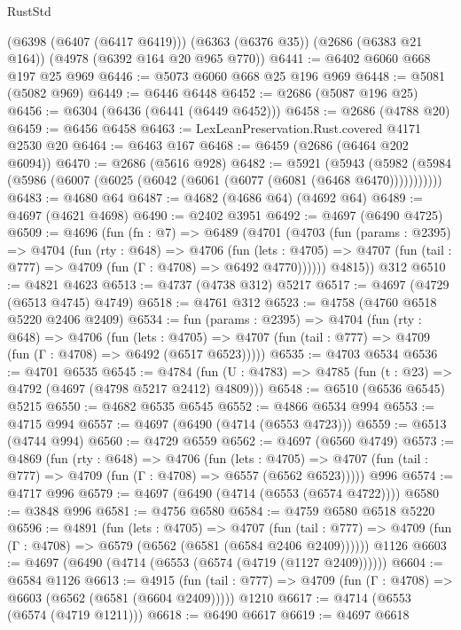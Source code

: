 \begin{lexlean}{RustStd}
\begin{coremodule}
    (@6398 (@6407 (@6417 @6419)))
    (@6363 (@6376 @35))
    (@2686 (@6383 @21 @164))
    (@4978 (@6392 @164 @20 @965 @770))
@6441 := @6402 @6060 @668 @197 @25 @969
@6446 := @5073 @6060 @668 @25 @196 @969
@6448 := @5081 (@5082 @969)
@6449 := @6446 @6448
@6452 := @2686 (@5087 @196 @25)
@6456 := @6304 (@6436 (@6441 (@6449 @6452)))
@6458 := @2686 (@4788 @20)
@6459 := @6456 @6458
@6463 := LexLeanPreservation.Rust.covered @4171 @2530 @20
@6464 := @6463 @167
@6468 := @6459 (@2686 (@6464 @202 @6094))
@6470 := @2686 (@5616 @928)
@6482 := @5921
    (@5943 (@5982 (@5984 (@5986 (@6007 (@6025 (@6042 (@6061 (@6077 (@6081 (@6468 @6470)))))))))))
@6483 := @4680 @64
@6487 := @4682 (@4686 @64) (@4692 @64)
@6489 := @4697 (@4621 @4698)
@6490 := @2402 @3951
@6492 := @4697 (@6490 @4725)
@6509 := @4696
    (fun (fn : @7) =>
    @6489
      (@4701
        (@4703
          (fun (params : @2395) =>
          @4704
            (fun (rty : @648) =>
            @4706
              (fun (lets : @4705) =>
              @4707 (fun (tail : @777) => @4709 (fun (Γ : @4708) => @6492 @4770))))))
        @4815))
    @312
@6510 := @4821 @4623
@6513 := @4737 (@4738 @312) @5217
@6517 := @4697 (@4729 (@6513 @4745) @4749)
@6518 := @4761 @312
@6523 := @4758 (@4760 @6518 @5220 @2406 @2409)
@6534 := fun (params : @2395) =>
  @4704
    (fun (rty : @648) =>
    @4706
      (fun (lets : @4705) =>
      @4707 (fun (tail : @777) => @4709 (fun (Γ : @4708) => @6492 (@6517 @6523)))))
@6535 := @4703 @6534
@6536 := @4701 @6535
@6545 := @4784 (fun (U : @4783) => @4785 (fun (t : @23) => @4792 (@4697 (@4798 @5217 @2412) @4809)))
@6548 := @6510 (@6536 @6545) @5215
@6550 := @4682 @6535 @6545
@6552 := @4866 @6534 @994
@6553 := @4715 @994
@6557 := @4697 (@6490 (@4714 (@6553 @4723)))
@6559 := @6513 (@4744 @994)
@6560 := @4729 @6559
@6562 := @4697 (@6560 @4749)
@6573 := @4869
    (fun (rty : @648) =>
    @4706
      (fun (lets : @4705) =>
      @4707 (fun (tail : @777) => @4709 (fun (Γ : @4708) => @6557 (@6562 @6523)))))
    @996
@6574 := @4717 @996
@6579 := @4697 (@6490 (@4714 (@6553 (@6574 @4722))))
@6580 := @3848 @996
@6581 := @4756 @6580
@6584 := @4759 @6580 @6518 @5220
@6596 := @4891
    (fun (lets : @4705) =>
    @4707
      (fun (tail : @777) => @4709 (fun (Γ : @4708) => @6579 (@6562 (@6581 (@6584 @2406 @2409))))))
    @1126
@6603 := @4697 (@6490 (@4714 (@6553 (@6574 (@4719 (@1127 @2409))))))
@6604 := @6584 @1126
@6613 := @4915
    (fun (tail : @777) => @4709 (fun (Γ : @4708) => @6603 (@6562 (@6581 (@6604 @2409)))))
    @1210
@6617 := @4714 (@6553 (@6574 (@4719 @1211)))
@6618 := @6490 @6617
@6619 := @4697 @6618

\end{coremodule}
\end{lexlean}
